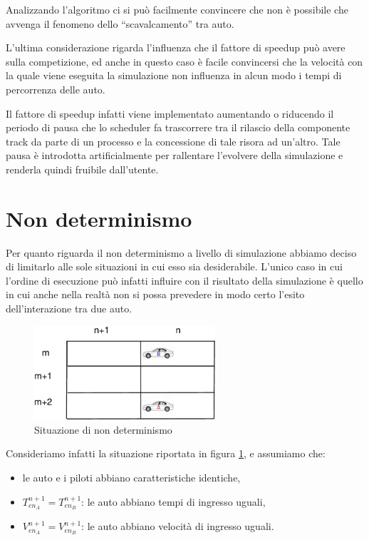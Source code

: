 \documentclass[11pt,a4paper]{report}
\begin{document}
Analizzando l'algoritmo ci si può facilmente convincere che non è possibile che avvenga il fenomeno dello ``scavalcamento'' tra auto.

L'ultima considerazione rigarda l'influenza che il fattore di speedup può avere sulla competizione, ed anche in questo caso è facile convincersi che la velocità con la quale viene eseguita la simulazione non influenza in alcun modo i tempi di percorrenza delle auto.

Il fattore di speedup infatti viene implementato aumentando o riducendo il periodo di pausa che lo scheduler fa trascorrere tra il rilascio della componente track da parte di un processo e la concessione di tale risora ad un'altro.
Tale pausa è introdotta artificialmente per rallentare l'evolvere della simulazione e renderla quindi fruibile dall'utente.

\section{Non determinismo}
Per quanto riguarda il non determinismo a livello di simulazione abbiamo deciso di limitarlo alle sole situazioni in cui esso sia desiderabile.
L'unico caso in cui l'ordine di esecuzione può infatti influire con il risultato della simulazione è quello in cui anche nella realtà non si possa prevedere in modo certo l'esito dell'interazione tra due auto.

\begin{figure}
\includegraphics[width=0.6\textwidth]{diagrammi/NonDet}
\caption{Situazione di non determinismo}
\label{fig:nonDet}
\end{figure}

Consideriamo infatti la situazione riportata in figura \ref{fig:nonDet}, e assumiamo che:
\begin{itemize}
\item le auto e i piloti abbiano caratteristiche identiche,
\item $T_{en_A}^{n+1} = T_{en_B}^{n+1}$: le auto abbiano tempi di ingresso uguali,
\item $V_{en_A}^{n+1} = V_{en_B}^{n+1}$: le auto abbiano velocità di ingresso uguali.
\end{itemize}
\end{document}
